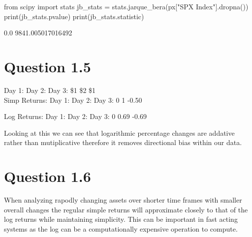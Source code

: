 \begin{python}[language=Python]
from scipy import stats
jb_stats = stats.jarque_bera(px["SPX Index"].dropna())
print(jb_stats.pvalue)
print(jb_stats.statistic)
\end{python}

\begin{python}
0.0
9841.005017016492
\end{python}

\hypertarget{question-1.5}{%
\section{Question 1.5}\label{question-1.5}}

Day 1: Day 2: Day 3: \$1 \$2 \$1\\
Simp Returns: Day 1: Day 2: Day 3: 0 1 -0.50

Log Returns: Day 1: Day 2: Day 3: 0 0.69 -0.69

Looking at this we can see that logarithmic percentage changes are
addative rather than mutiplicative therefore it removes directional bias
within our data.

\hypertarget{question-1.6}{%
\section{Question 1.6}\label{question-1.6}}

When analyzing rapodly changing assets over shorter time frames with
smaller overall changes the regular simple returns will approximate
closely to that of the log returns while maintaining simplicity. This
can be important in fast acting systems as the log can be a
computationally expensive operation to compute.
